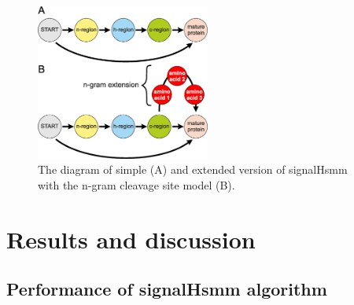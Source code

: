 \documentclass[10pt,letterpaper]{article}
\begin{document}

\begin{figure}[ht]\centering
\includegraphics[width=0.51\textwidth]{figures/HSMMs.eps}
\caption{The diagram of simple (A) and extended version of signalHsmm with the n-gram cleavage site model (B).}
\label{fig:ngramext}
\end{figure}

    
% 


\section*{Results and discussion}

\subsection*{Performance of signalHsmm algorithm}
\end{document}
